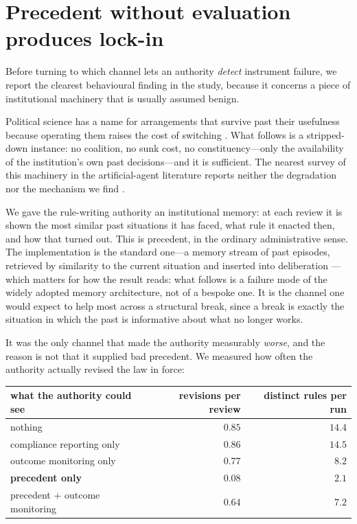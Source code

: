 \documentclass[11pt]{article}
\begin{document}
\section{Precedent without evaluation produces lock-in}
\label{sec:lockin-social}

Before turning to which channel lets an authority \emph{detect} instrument failure, we report the
clearest behavioural finding in the study, because it concerns a piece of institutional machinery
that is usually assumed benign.

Political science has a name for arrangements that survive past their usefulness because operating
them raises the cost of switching \citep{pierson2000increasing}. What follows is a stripped-down
instance: no coalition, no sunk cost, no constituency---only the availability of the institution's own
past decisions---and it is sufficient. The nearest survey of this machinery in the artificial-agent
literature reports neither the degradation nor the mechanism we find \citep{jiang2026anatomy}.

We gave the rule-writing authority an institutional memory: at each review it is shown the most
similar past situations it has faced, what rule it enacted then, and how that turned out. This is
precedent, in the ordinary administrative sense. The implementation is the standard one---a memory
stream of past episodes, retrieved by similarity to the current situation and inserted into
deliberation \citep{park2023generative}---which matters for how the result reads: what follows is a
failure mode of the widely adopted memory architecture, not of a bespoke one. It is the channel one
would expect to help most across a structural break, since a break is exactly the situation in which
the past is informative about what no longer works.

It was the only channel that made the authority measurably \emph{worse}, and the reason is not that
it supplied bad precedent. We measured how often the authority actually revised the law in force:

\begin{center}\small
\begin{tabular}{@{}lrr@{}}
\toprule
what the authority could see & revisions per review & distinct rules per run \\
\midrule
nothing & $0.85$ & $14.4$ \\
compliance reporting only & $0.86$ & $14.5$ \\
outcome monitoring only & $0.77$ & $8.2$ \\
\textbf{precedent only} & $\mathbf{0.08}$ & $\mathbf{2.1}$ \\
precedent $+$ outcome monitoring & $0.64$ & $7.2$ \\
\bottomrule
\end{tabular}
\end{center}
\end{document}
